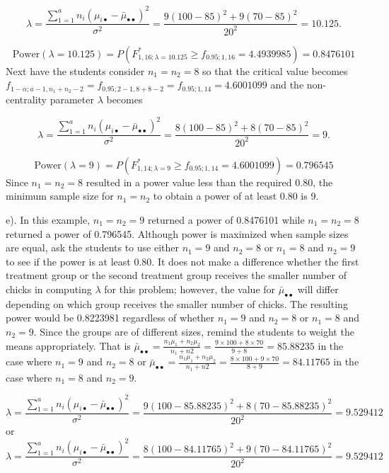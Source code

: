 \documentclass[
]{article}
\begin{document}
\begin{equation*}
\lambda = \frac{\sum_{1 = 1}^an_i(\mu_{i\bullet} - \bar{\mu}_{\bullet\bullet})^2}{\sigma^2} = \frac{9(100 - 85)^2 + 9(70 - 85)^2}{20^2} = 10.125.
\end{equation*}

\[\text{Power}(\lambda = 10.125) = P(F^*_{1, 16; \lambda = 10.125} \geq f_{0.95; 1, 16} = 4.4939985) = 0.8476101\]
Next have the students consider \(n_1 = n_2 = 8\) so that the critical value becomes
\(f_{1 - \alpha; a - 1, n_1 + n_2 -2} = f_{0.95; 2 - 1, 8 + 8 -2} = f_{0.95; 1, 14} = 4.6001099\) and the non-centrality parameter \(\lambda\) becomes

\begin{equation*}
\lambda = \frac{\sum_{1 = 1}^an_i(\mu_{i\bullet} - \bar{\mu}_{\bullet\bullet})^2}{\sigma^2} = \frac{8(100 - 85)^2 + 8(70 - 85)^2}{20^2} = 9.
\end{equation*}

\[\text{Power}(\lambda = 9) = P(F^*_{1, 14; \lambda = 9} \geq f_{0.95; 1, 14} = 4.6001099) = 0.796545\]
Since \(n_1 = n_2 = 8\) resulted in a power value less than the required 0.80, the minimum sample size for \(n_1 = n_2\) to obtain a power of at least 0.80 is 9.

e). In this example, \(n_1 = n_2 = 9\) returned a power of 0.8476101 while \(n_1 = n_2 = 8\) returned a power of 0.796545. Although power is maximized when sample sizes are equal, ask the students to use either \(n_1 = 9\) and \(n_2 = 8\) or \(n_1 = 8\) and \(n_2 = 9\) to see if the power is at least 0.80. It does not make a difference whether the first treatment group or the second treatment group receives the smaller number of chicks in computing \(\lambda\) for this problem; however, the value for \(\bar{\mu}_{\bullet\bullet}\) will differ depending on which group receives the smaller number of chicks. The resulting power would be 0.8223981 regardless of whether \(n_1 = 9\) and \(n_2 = 8\) or \(n_1 = 8\) and \(n_2 = 9\). Since the groups are of different sizes, remind the students to weight the means appropriately. That is \(\bar{\mu}_{\bullet\bullet} = \frac{n_1\mu_1+n_2\mu_2}{n_1+n2} =\frac{9\times 100 + 8 \times 70}{9 + 8}=85.88235\) in the case where \(n_1 = 9\) and \(n_2 = 8\) or \(\bar{\mu}_{\bullet\bullet} = \frac{n_1\mu_1+n_2\mu_2}{n_1+n2} =\frac{8\times 100 + 9\times 70}{8 + 9}=84.11765\) in the case where \(n_1 = 8\) and \(n_2 = 9\).

\begin{equation*}
\lambda = \frac{\sum_{1 = 1}^an_i(\mu_{i\bullet} - \bar{\mu}_{\bullet\bullet})^2}{\sigma^2} = \frac{9(100 - 85.88235)^2 + 8(70 - 85.88235)^2}{20^2} = 9.529412
\end{equation*}
or
\begin{equation*}
\lambda = \frac{\sum_{1 = 1}^an_i(\mu_{i\bullet} - \bar{\mu}_{\bullet\bullet})^2}{\sigma^2} = \frac{8(100 - 84.11765)^2 + 9(70 - 84.11765)^2}{20^2} = 9.529412
\end{equation*}
\end{document}
